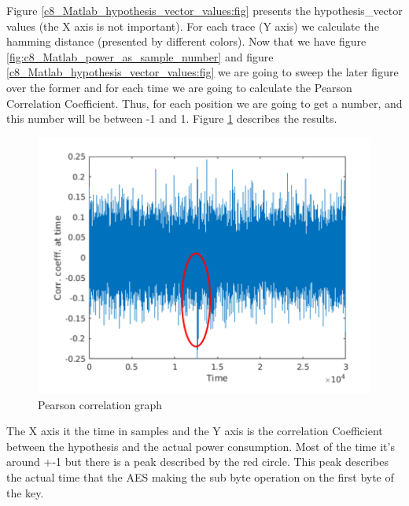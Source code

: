 Figure \ref{c8_Matlab_hypothesis_vector_values:fig} presents the
hypothesis\_vector values (the X axis is not important). For each trace (Y axis)
we calculate the hamming distance (presented by different colors). Now that we
have figure \ref{fig:c8_Matlab_power_as_sample_number} and figure
\ref{c8_Matlab_hypothesis_vector_values:fig} we are going to sweep the later
figure over the former and for  each time we are going to calculate the Pearson
Correlation Coefficient. Thus, for each position we are going to get a number,
and this number will be between -1 and 1. Figure
\ref{c8_Matlab_pearson_correlation:fig} describes the results. 
\begin{figure}[!ht]
    \centering
    \includegraphics[width=1.0\textwidth]{images/chapter8/pearson_correlation_numbers.png}
    \caption{Pearson correlation graph} \label{c8_Matlab_pearson_correlation:fig}
\end{figure}
The X axis it the time in samples and the Y axis is the correlation Coefficient
between the hypothesis and the actual power consumption. Most of the time it's
around +-1 but there is a peak described by the red circle. This peak describes
the actual time that the AES making the sub byte operation on the first byte of
the key. 

